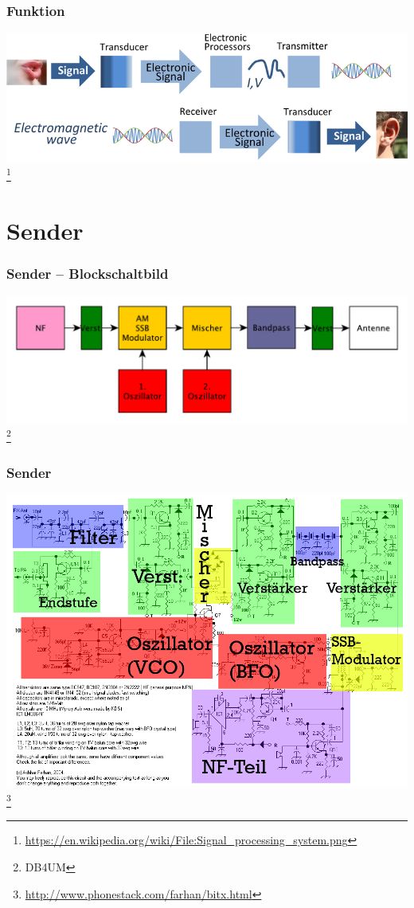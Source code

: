 \begin{frame}
    \frametitle{Funktion}
    \begin{center}
        \includegraphics[width=1\textwidth]{e15/TRX-superSimple.png}
        \footnote{\tiny \url{https://en.wikipedia.org/wiki/File:Signal_processing_system.png}}
	\end{center}
\end{frame}
  
\section*{Sender}

\begin{frame}
    \frametitle{Sender -- Blockschaltbild}
    \begin{center}
        \includegraphics[width=1\textwidth]{e15/ssb-trx-bsb.pdf}
        \footnote{\tiny DB4UM}
	\end{center}
\end{frame}

\begin{frame}
    \frametitle{Sender}
    \begin{center}
        \includegraphics[width=.95\textwidth,height=.8\textheight,keepaspectratio]{e15/bitx-farbe.png}
        \footnote{\tiny \url{http://www.phonestack.com/farhan/bitx.html}}
	\end{center}
\end{frame}

